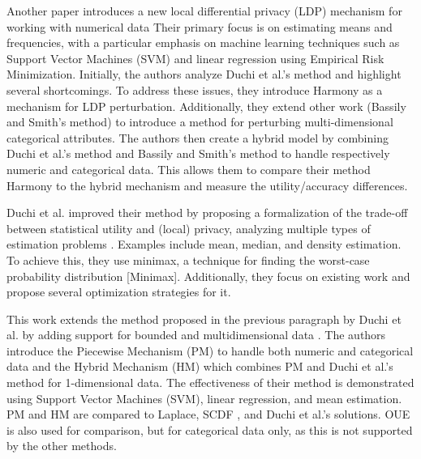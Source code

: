 Another paper introduces a new local differential privacy (LDP) mechanism for working with numerical data \citep{nguyen_collecting_2016}
Their primary focus is on estimating means and frequencies, with a particular emphasis on machine learning techniques such as Support Vector Machines (SVM) and linear regression using Empirical Risk Minimization.
Initially, the authors analyze Duchi et al.'s method \citep{duchi_privacy_2013} and highlight several shortcomings.
To address these issues, they introduce Harmony as a mechanism for LDP perturbation. Additionally, they extend other work (Bassily and Smith's method) to introduce a method for perturbing multi-dimensional categorical attributes.
The authors then create a hybrid model by combining Duchi et al.'s method and Bassily and Smith's method to handle respectively numeric and categorical data. This allows them to compare their method Harmony to the hybrid mechanism and measure the utility/accuracy differences.

Duchi et al. improved their method by proposing a formalization of the trade-off between statistical utility and (local) privacy, analyzing multiple types of estimation problems \citep{duchi_minimax_2017}.
Examples include mean, median, and density estimation.
To achieve this, they use minimax, a technique for finding the worst-case probability distribution [Minimax].
Additionally, they focus on existing work and propose several optimization strategies for it.

This work extends the method proposed in the previous paragraph by Duchi et al. by adding support for bounded and multidimensional data \citep{wang_collecting_2019}.
The authors introduce the Piecewise Mechanism (PM) to handle both numeric and categorical data and the Hybrid Mechanism (HM) which combines PM and Duchi et al.'s method for 1-dimensional data.
The effectiveness of their method is demonstrated using Support Vector Machines (SVM), linear regression, and mean estimation.
PM and HM are compared to Laplace, SCDF , and Duchi et al.'s solutions.
OUE  is also used for comparison, but for categorical data only, as this is not supported by the other methods.


